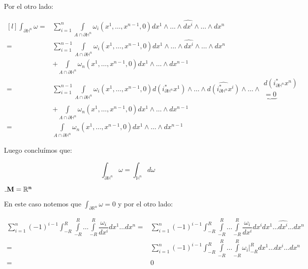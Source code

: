 \documentclass[11pt]{article}
\newcommand{\R}{{\mathbb{R}}}
\numberwithin{theorem}{subsection}
\newenvironment{proof}[1][Demostraci\'on]{\begin{trivlist}
		\item[\hskip \labelsep {\bfseries #1}]}{\end{trivlist}}
\begin{document}
\begin{proof}
	Por el otro lado:
	
	\begin{equation*}
	\begin{aligned}[l]
		\int_{\partial \mathbb{H}^n} {\omega} = & \sum\limits_{i =1 }^{n} {\int\limits_{A \cap \partial \mathbb{H}^n}  \omega_i(x^1, \dots, x^{n-1},0) dx^1 \wedge \dots \wedge \widehat{dx^i} \wedge \dots \wedge dx^n} \\
		 = & \sum\limits_{i =1 }^{n-1} {\int\limits_{A \cap \partial \mathbb{H}^n}  \omega_i(x^1, \dots, x^{n-1},0) dx^1 \wedge \dots \wedge \widehat{dx^i} \wedge \dots \wedge dx^n}  \\ & + {\int\limits_{A \cap \partial \mathbb{H}^n}  \omega_n(x^1, \dots, x^{n-1},0) dx^1 \wedge \dots \wedge dx^{n-1}} \\
		 = & \sum\limits_{i =1 }^{n-1} {\int\limits_{A \cap \partial \mathbb{H}^n}  \omega_i(x^1, \dots, x^{n-1},0) d(i^*_{\partial \mathbb{H}^n}x^1) \wedge \dots \wedge \widehat{d(i^*_{\partial \mathbb{H}^n}x^i)} \wedge \dots \wedge \substack{d(i^*_{\partial \mathbb{H}^n}x^{n}) \\ \underbrace{= 0 } } } \\ & + {\int\limits_{A \cap \partial \mathbb{H}^n}  \omega_n(x^1, \dots, x^{n-1},0) dx^1 \wedge \dots \wedge dx^{n-1}}  \\
		 = & {\int\limits_{A \cap \partial \mathbb{H}^n}  \omega_n(x^1, \dots, x^{n-1},0) dx^1 \wedge \dots \wedge dx^{n-1}} 
	\end{aligned}
	\end{equation*}
	
	Luego conclu\'imos que:
	
	$$\int_{\partial \mathbb{H}^n} {\omega} =  \int_{\mathbb{H}^n} {d \omega} $$
	
		\medskip
	
	$\mathunderscore{\mathbf{M = \R^n}}$
	
	\medskip
	
	En este caso notemos que $\int_{\partial \mathbb{R}^n} {\omega} = 0$ y por el otro lado:
	
		\begin{equation*}
	\begin{aligned}
	\sum\limits_{i =1 }^{n} {(-1)^{i-1} \int_{-R}^{R} \int\limits_{-R}^{R} \dots \int\limits_{-R}^{R} \dfrac{\omega_i}{dx^i}  dx^1 \dots dx^n} = & \sum\limits_{i =1 }^{n} {(-1)^{i-1} \int_{-R}^{R} \int\limits_{-R}^{R} \dots \int\limits_{-R}^{R} \dfrac{\omega_i}{dx^i}  dx^i dx^1 \dots \widehat{dx^i} \dots dx^n} \\
	= &  \sum\limits_{i =1 }^{n} {(-1)^{i-1} \int_{-R}^{R} \int\limits_{-R}^{R} \dots \int\limits_{-R}^{R} \omega_i \vert_{-R}^{R} dx^1 \dots \widehat{dx^i} \dots dx^n} \\
	= & 0
	\end{aligned}
	\end{equation*}
	

\end{proof}
\end{document}
